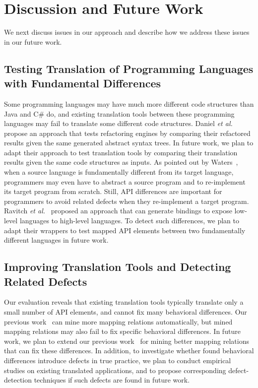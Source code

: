 

\section{Discussion and Future Work}
\label{sec:discuss}

We next discuss issues in our approach and describe how we address
these issues in our future work.

\subsection{Testing Translation of Programming Languages with Fundamental Differences} Some programming languages may have much more different code structures than Java and C\# do, and existing translation tools between these programming languages may fail to translate some different code structures. Daniel \emph{et al.}~\citep{daniel2007automated} propose an approach that tests refactoring engines by comparing their refactored results given the same generated abstract syntax trees. In future work, we plan to adapt their approach to test translation tools by comparing their translation results given the same code structures as inputs. As pointed out by Waters~\citep{waters1988program}, when a source language is fundamentally different from its target language, programmers may even have to abstract a source program and to re-implement its target program from scratch. Still, API differences are important for programmers to avoid related defects when they re-implement a target program. Ravitch \emph{et al.}~\citep{RavitchJAL09} proposed an
approach that can generate bindings to expose low-level languages to high-level languages. To detect such differences, we plan to adapt their wrappers to test mapped API elements between two fundamentally different languages in future work.

\subsection{Improving Translation Tools and Detecting Related Defects} Our evaluation reveals that existing translation tools typically translate only a small number of API elements, and cannot fix many behavioral differences. Our previous work~\citep{zhong2010mining} can mine more mapping relations automatically, but mined mapping relations may also fail to fix specific behavioral differences. In future work, we plan to extend our previous work~\citep{zhong2010mining} for mining better mapping relations that can fix these differences. In addition, to investigate whether found behavioral differences introduce defects in true practice, we plan to conduct empirical studies on existing translated applications, and to propose corresponding defect-detection techniques if such defects are found in future work.

